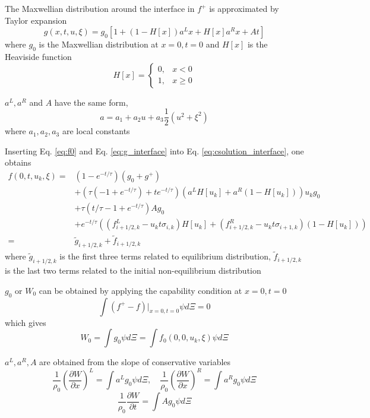 \documentclass[a4paper]{book}
\begin{document}
The Maxwellian distribution around the interface in $f^+$ is approximated by Taylor expansion
\begin{equation} 
    \label{eq:g_interface}
    g(x,t,u,\xi)=g_0[1+(1-H[x])a^Lx+H[x]a^Rx+At]
\end{equation}
where $g_0$ is the Maxwellian distribution at $x=0,t=0$ and $H[x]$ is the Heaviside function$$H[x]=\begin{cases}0,& x<0\\ 1,& x\geqslant 0\end{cases}$$

$a^L,a^R$ and $A$ have the same form,
$$ a = a_1+a_2u+a_3\frac{1}{2}(u^2+\xi^2)$$
where $a_1,a_2,a_3$ are local constants

Inserting Eq. \ref{eq:f0} and Eq. \ref{eq:g_interface} into Eq. \ref{eq:csolution_interface}, one obtains
\begin{equation} 
    \label{eq:csolution_final}
    \begin{aligned}
        f(0,t,u_k,\xi)=&(1-e^{-t/\tau})(g_0+g^+)\\
                       &+(\tau(-1+e^{-t/\tau})+te^{-t/\tau})(a^LH[u_k]+a^R(1-H[u_k]))u_kg_0\\
                       &+\tau(t/\tau-1+e^{-t/\tau})Ag_0\\
                       &+e^{-t/\tau}((f_{i+1/2,k}^L-u_kt\sigma_{i,k})H[u_k]+(f_{i+1/2,k}^R-u_kt\sigma_{i+1,k})(1-H[u_k]))\\
        =&{\tilde g}_{i+1/2,k}+{\tilde f}_{i+1/2,k}
    \end{aligned}
\end{equation}
where ${\tilde g}_{i+1/2,k}$ is the first three terms related to equilibrium distribution, ${\tilde f}_{i+1/2,k}$ is the last two terms related to the initial non-equilibrium distribution

$g_0$ or $W_0$ can be obtained by applying the capability condition at $x=0,t=0$
$$\int (f^+-f)|_{x=0,t=0}\psi d\Xi=0$$
which gives
\begin{equation} 
    \label{eq:solve_g0}
    W_0=\int g_0\psi d\Xi=\int f_0(0,0,u_k,\xi)\psi d\Xi
\end{equation}

$a^L,a^R,A$ are obtained from the slope of conservative variables
\begin{equation}
    \label{eq:microslope_space}
    \frac{1}{\rho_0}\left(\frac{\partial W}{\partial x}\right)^L=\int a^L g_0\psi d\Xi,\quad \frac{1}{\rho_0}\left(\frac{\partial W}{\partial x}\right)^R=\int a^R g_0\psi d\Xi
\end{equation}
\begin{equation} 
    \label{eq:microslope_time}
    \frac{1}{\rho_0}\frac{\partial W}{\partial t}=\int Ag_0\psi d\Xi
\end{equation}
\end{document}
